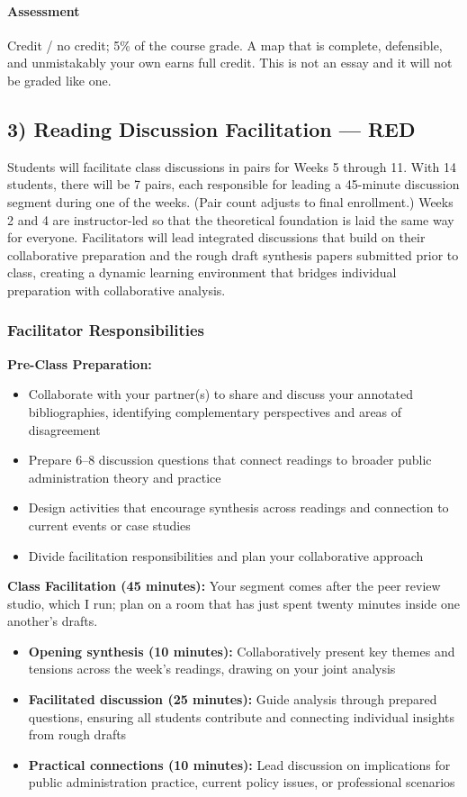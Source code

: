 \documentclass[11pt]{article}     %
\begin{document}
\paragraph*{Assessment}
Credit / no credit; 5\% of the course grade. A map that is complete, defensible, and unmistakably your own earns full credit. This is not an essay and it will not be graded like one.

\subsection*{3) Reading Discussion Facilitation --- RED}

Students will facilitate class discussions in pairs for Weeks 5 through 11. With 14 students, there will be 7 pairs, each responsible for leading a 45-minute discussion segment during one of the weeks. (Pair count adjusts to final enrollment.) Weeks 2 and 4 are instructor-led so that the theoretical foundation is laid the same way for everyone. Facilitators will lead integrated discussions that build on their collaborative preparation and the rough draft synthesis papers submitted prior to class, creating a dynamic learning environment that bridges individual preparation with collaborative analysis.

\subsubsection*{Facilitator Responsibilities}

\textbf{Pre-Class Preparation:}
\begin{itemize}
    \item Collaborate with your partner(s) to share and discuss your annotated bibliographies, identifying complementary perspectives and areas of disagreement
    \item Prepare 6--8 discussion questions that connect readings to broader public administration theory and practice
    \item Design activities that encourage synthesis across readings and connection to current events or case studies
    \item Divide facilitation responsibilities and plan your collaborative approach
\end{itemize}

\textbf{Class Facilitation (45 minutes):} Your segment comes after the peer review studio, which I run; plan on a room that has just spent twenty minutes inside one another's drafts.
\begin{itemize}
    \item \textbf{Opening synthesis (10 minutes):} Collaboratively present key themes and tensions across the week's readings, drawing on your joint analysis
    \item \textbf{Facilitated discussion (25 minutes):} Guide analysis through prepared questions, ensuring all students contribute and connecting individual insights from rough drafts
    \item \textbf{Practical connections (10 minutes):} Lead discussion on implications for public administration practice, current policy issues, or professional scenarios
\end{itemize}
\end{document}
